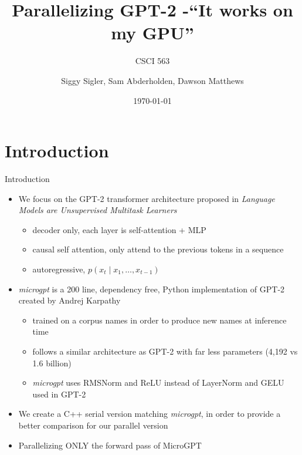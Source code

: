 \documentclass[aspectratio=169]{beamer}
\title{Parallelizing GPT-2 -``It works on my GPU''}
\subtitle{CSCI 563}
\author{Siggy Sigler, Sam Abderholden, Dawson Matthews}
\institute{Colorado School of Mines}
\date{\today}
\begin{document}
\begin{frame}
  \titlepage
\end{frame}

\section{Introduction}
\begin{frame}{Introduction}
    \begin{itemize}
        \item We focus on the GPT-2 transformer architecture proposed in \textit{Language Models are Unsupervised Multitask Learners}
        \begin{itemize}
            \item decoder only, each layer is self-attention + MLP 
            \item causal self attention, only attend to the previous tokens in a sequence
            \item autoregressive, $p(x_t \mid x_1, \dots, x_{t-1})$
        \end{itemize}
        \item \textit{microgpt} is a 200 line, dependency free, Python implementation of GPT-2 created by Andrej Karpathy
        \begin{itemize}
            \item trained on a corpus names in order to produce new names at inference time 
            \item follows a similar architecture as GPT-2 with far less parameters (4,192 vs 1.6 billion)
            \item \textit{microgpt} uses RMSNorm and ReLU instead of LayerNorm and GELU used in GPT-2 
        \end{itemize}
        \item We create a C++ serial version matching \textit{microgpt}, in order to provide a better comparison for our parallel version
        \item Parallelizing ONLY the forward pass of MicroGPT
    \end{itemize}
\end{frame}
\end{document}
